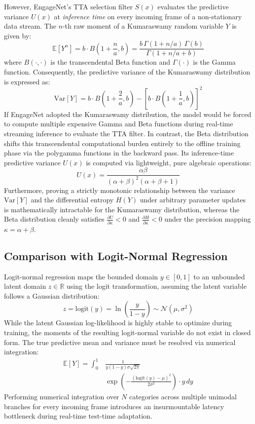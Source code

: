 \documentclass[10pt,a4paper,twocolumn]{article}
\newcommand{\R}{\mathbb{R}}
\begin{document}
	However, EngageNet's TTA selection filter $S(x)$ evaluates the predictive variance $U(x)$ at \textit{inference time} on every incoming frame of a non-stationary data stream. The $n$-th raw moment of a Kumaraswamy random variable $Y$ is given by:
	$$\mathbb{E}[Y^n] = b \cdot B\left(1 + \frac{n}{a}, b\right) = \frac{b \, \Gamma(1 + n/a)\,\Gamma(b)}{\Gamma(1 + n/a + b)}$$
	where $B(\cdot,\cdot)$ is the transcendental Beta function and $\Gamma(\cdot)$ is the Gamma function. Consequently, the predictive variance of the Kumaraswamy distribution is expressed as:
	$$\text{Var}[Y] = b \cdot B\left(1 + \frac{2}{a}, b\right) - \left[ b \cdot B\left(1 + \frac{1}{a}, b\right) \right]^2$$
	If EngageNet adopted the Kumaraswamy distribution, the model would be forced to compute multiple expensive Gamma and Beta functions during real-time streaming inference to evaluate the TTA filter. In contrast, the Beta distribution shifts this transcendental computational burden entirely to the offline training phase via the polygamma functions in the backward pass. Its inference-time predictive variance $U(x)$ is computed via lightweight, pure algebraic operations:
	$$U(x) = \frac{\alpha \beta}{(\alpha + \beta)^2 (\alpha + \beta + 1)}$$
	Furthermore, proving a strictly monotonic relationship between the variance $\text{Var}[Y]$ and the differential entropy $H(Y)$ under arbitrary parameter updates is mathematically intractable for the Kumaraswamy distribution, whereas the Beta distribution cleanly satisfies $\frac{\partial U}{\partial \kappa} < 0$ and $\frac{\partial H}{\partial \kappa} < 0$ under the precision mapping $\kappa = \alpha + \beta$.
	
	\subsection*{Comparison with Logit-Normal Regression}
	Logit-normal regression maps the bounded domain $y \in [0,1]$ to an unbounded latent domain $z \in \R$ using the logit transformation, assuming the latent variable follows a Gaussian distribution:
	$$z = \text{logit}(y) = \ln\left(\frac{y}{1-y}\right) \sim \mathcal{N}(\mu, \sigma^2)$$
	While the latent Gaussian log-likelihood is highly stable to optimize during training, the moments of the resulting logit-normal variable do not exist in closed form. The true predictive mean and variance must be resolved via numerical integration:
	$$\begin{aligned}\mathbb{E}[Y] = \int_{0}^{1} &\frac{1}{y(1-y)\sigma\sqrt{2\pi}} \\ &\exp\left( -\frac{(\text{logit}(y) - \mu)^2}{2\sigma^2} \right) \cdot y \, dy\end{aligned}$$
	Performing numerical integration over $N$ categories across multiple unimodal branches for every incoming frame introduces an insurmountable latency bottleneck during real-time test-time adaptation. 
	
\end{document}
